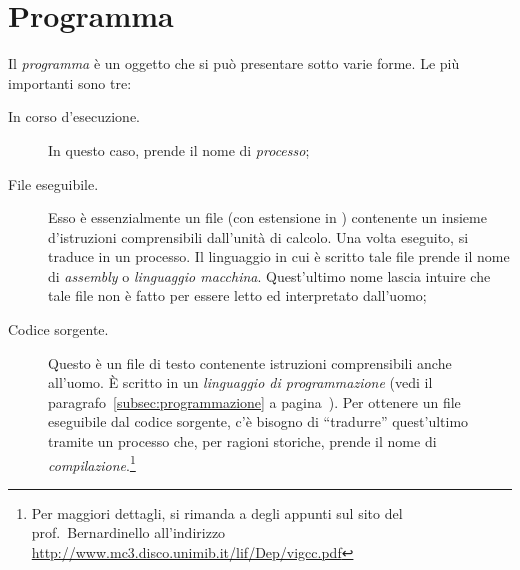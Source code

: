 	\section{Programma}
Il \emph{programma} è un oggetto che si può presentare sotto varie forme. Le più importanti sono tre:
\begin{description}
	\item[In corso d'esecuzione.] In questo caso, prende il nome di \emph{processo};
	\item[File eseguibile.] Esso è essenzialmente un file (con estensione  in ) contenente un insieme d'istruzioni comprensibili dall'unità di calcolo. Una volta eseguito, si traduce in un processo. Il linguaggio in cui è scritto tale file prende il nome di \emph{assembly} o \emph{linguaggio macchina}. Quest'ultimo nome lascia intuire che tale file non è fatto per essere letto ed interpretato dall'uomo;
	\item[Codice sorgente.] Questo è un file di testo contenente istruzioni comprensibili anche all'uomo. \`E scritto in un \emph{linguaggio di programmazione} (vedi il paragrafo~\ref{subsec:programmazione} a pagina~\pageref{subsec:programmazione}). Per ottenere un file eseguibile dal codice sorgente, c'è bisogno di ``tradurre'' quest'ultimo tramite un processo che, per ragioni storiche, prende il nome di \emph{compilazione}.\footnote{Per maggiori dettagli, si rimanda a degli appunti sul sito del prof.~Bernardinello all'indirizzo \url{http://www.mc3.disco.unimib.it/lif/Dep/vigcc.pdf}}
\end{description}